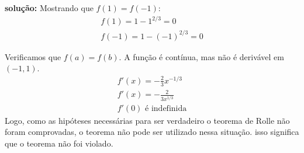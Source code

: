 \textbf{solução: } 
Mostrando que $f(1)=f(-1)$:
\begin{equation}
    \begin{split}
        f(1) = 1 - 1^{2/3} = 0 \\
        f(-1) = 1 - (-1)^{2/3} = 0
    \end{split}
\end{equation}

Verificamos que $f(a)=f(b)$. A função é contínua, mas não é derivável em $(-1,1)$.
\begin{equation}
    \begin{split}
        f'(x)=-\frac{2}{3}x^{-1/3} \\
        f'(x) = - \frac{2}{3x^{1/3}} \\
        f'(0) \text{ é indefinida}
    \end{split}
\end{equation}
Logo, como as hipóteses necessárias para ser verdadeiro o teorema de Rolle não foram comprovadas, o teorema não pode ser utilizado nessa situação. isso significa que o teorema não foi violado.